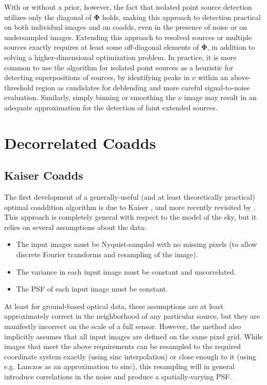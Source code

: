 \documentclass[10pt]{article}
\begin{document}
With or without a prior, however, the fact that isolated point source detection utilizes only the diagonal of $\bm{\Phi}$ holds, making this approach to detection practical on both individual images and on coadds, even in the presence of noise or on undersampled images.  Extending this approach to resolved sources or multiple sources exactly requires at least some off-diagonal elements of $\bm{\Phi}$, in addition to solving a higher-dimensional optimization problem.  In practice, it is more common to use the algorithm for isolated point sources as a heuristic for detecting superpositions of sources, by identifying peaks in $\nu$ within an above-threshold region as candidates for deblending and more careful signal-to-noise evaluation.  Similarly, simply binning or smoothing the $\nu$ image may result in an adequate approximation for the detection of faint extended sources.

\section{Decorrelated Coadds}
\label{sec:decorrelated-coadds}



\subsection{Kaiser Coadds}
\label{sec:kaiser-coadds}

The first development of a generally-useful (and at least theoretically practical) optimal coaddition algorithm is due to Kaiser \citep{Kaiser2001}, and more recently revisited by \cite{2015arXiv151206879Z}.  This approach is completely general with respect to the model of the sky, but it relies on several assumptions about the data:
\begin{itemize}
\item The input images must be Nyquist-sampled with no missing pixels (to allow discrete Fourier transforms and resampling of the image).
\item The variance in each input image must be constant and uncorrelated.
\item The PSF of each input image must be constant.
\end{itemize}
At least for ground-based optical data, these assumptions are at least approximately correct in the neighborhood of any particular source, but they are manifestly incorrect on the scale of a full sensor.  However, the method also implicitly assumes that all input images are defined on the same pixel grid.  While images that meet the above requirements can be resampled to the required coordinate system exactly (using sinc interpolation) or close enough to it (using e.g. Lanczos as an approximation to sinc), this resampling will in general introduce correlations in the noise and produce a spatially-varying PSF.
\end{document}
